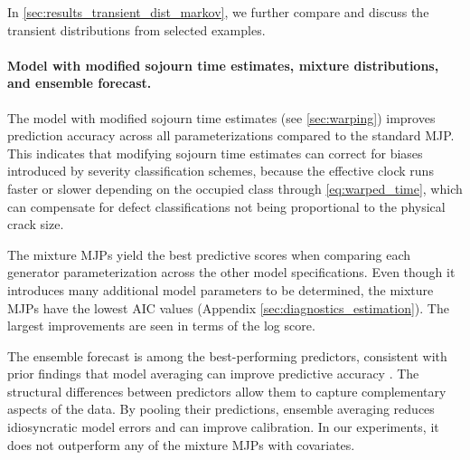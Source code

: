 \documentclass{article}
\begin{document}
In \cref{sec:results_transient_dist_markov}, we further compare and discuss the transient distributions from selected examples.



\paragraph{Model with modified sojourn time estimates, mixture distributions, and ensemble forecast.}
The model with modified sojourn time estimates (see \cref{sec:warping}) improves prediction accuracy across all parameterizations compared to the standard MJP. This indicates that modifying sojourn time estimates can correct for biases introduced by severity classification schemes, because the effective clock runs faster or slower depending on the occupied class through \cref{eq:warped_time}, which can compensate for defect classifications not being proportional to the physical crack size.

The mixture MJPs yield the best predictive scores when comparing each generator parameterization across the other model specifications. Even though it introduces many additional model parameters to be determined, the mixture MJPs have the lowest AIC values (Appendix \ref{sec:diagnostics_estimation}). The largest improvements are seen in terms of the log score.

The ensemble forecast is among the best-performing predictors, consistent with prior findings that model averaging can improve predictive accuracy \citep{wu2021a}. The structural differences between predictors allow them to capture complementary aspects of the data. By pooling their predictions, ensemble averaging reduces idiosyncratic model errors and can improve calibration. In our experiments, it does not outperform any of the mixture MJPs with covariates.
\end{document}
